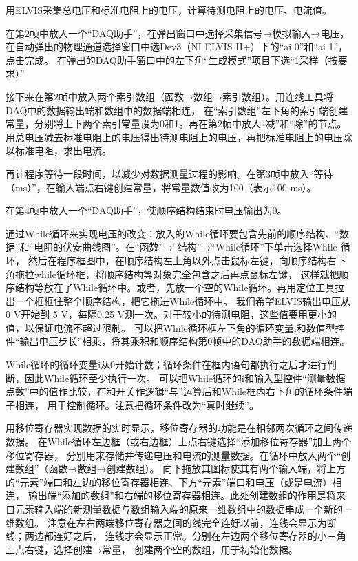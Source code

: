 \documentclass[12pt,a4paper]{article}
\begin{document}
    用ELVIS采集总电压和标准电阻上的电压，计算待测电阻上的电压、电流值。

    在第2帧中放入一个“DAQ助手”，在弹出窗口中选择采集信号→模拟输入→电压，
    在自动弹出的物理通道选择窗口中选Dev3（NI ELVIS II+）下的“ai 0”和“ai 1”，点击完成。
    在弹出的DAQ助手窗口中的左下角“生成模式”项目下选“1采样（按要求）”

    接下来在第2帧中放入两个索引数组（函数→数组→索引数组）。用连线工具将DAQ中的数据输出端和数组中的数据端相连，
    在“索引数组”左下角的索引端创建常量，分别将上下两个索引常量设为0和1。再在第2帧中放入“减”和“除”的节点。
    用总电压减去标准电阻上的电压得出待测电阻上的电压，再把标准电阻上的电压除以标准电阻，求出电流。

    再让程序等待一段时间，以减少对数据测量过程的影响。在第3帧中放入“等待（ms）”，在输入端点右键创建常量，将常量数值改为100（表示100 ms）。

    在第4帧中放入一个“DAQ助手”，使顺序结构结束时电压输出为0。

    通过While循环来实现电压的改变：放入的While循环要包含先前的顺序结构、“数据”和“电阻的伏安曲线图”。在“函数”→“结构”→“While循环”下单击选择While 循环，
    然后在程序框图中，在顺序结构左上角以外点击鼠标左键，向顺序结构右下角拖拉while循环框，将顺序结构等对象完全包含之后再点鼠标左键，
    这样就把顺序结构等放在了While循环中。或者，先放一个空的While循环。再用定位工具拉出一个框框住整个顺序结构，把它拖进While循环中。
    我们希望ELVIS输出电压从0 V开始到 5 V，每隔0.25 V测一次。对于较小的待测电阻，这些值要用更小的值，以保证电流不超过限制。
    可以把While循环框左下角的循环变量i和数值型控件“输出电压步长”相乘，将其乘积和顺序结构第0帧中的DAQ助手的数据端相连。

    While循环的循环变量i从0开始计数；循环条件在框内语句都执行之后才进行判断，因此While循环至少执行一次。
    可以把While循环的i和输入型控件“测量数据点数”中的值作比较，在和开关作逻辑“与”运算后和While框内右下角的循环条件端子相连，
    用于控制循环。注意把循环条件改为“真时继续”。

    用移位寄存器实现数据的实时显示，移位寄存器的功能是在相邻两次循环之间传递数据。
    在While循环左边框（或右边框）上点右键选择“添加移位寄存器”加上两个移位寄存器，
    分别用来存储并传递电压和电流的测量数据。在循环中放入两个“创建数组”（函数→数组→创建数组）。
    向下拖放其图标使其有两个输入端，将上方的“元素”端口和左边的移位寄存器相连、下方“元素”端口和电压（或是电流）相连，
    输出端“添加的数组”和右端的移位寄存器相连。此处创建数组的作用是将来自元素输入端的新测量数据与数组输入端的原来一维数组中的数据串成一个新的一维数组。
    注意在左右两端移位寄存器之间的线完全连好以前，连线会显示为断线；两边都连好之后，
    连线才会显示正常。分别在左边两个移位寄存器的小三角上点右键，选择创建→常量，
    创建两个空的数组，用于初始化数据。
\end{document}
